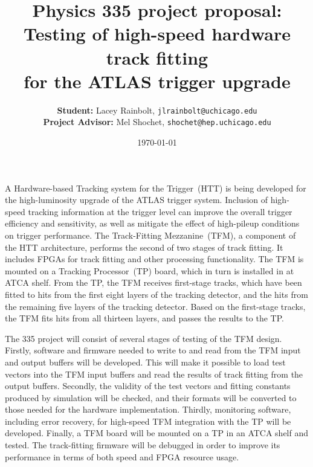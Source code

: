 \documentclass[12pt]{article}
\title{\Large %
	Physics 335 project proposal: \\
	Testing of high-speed hardware track fitting \\ for the ATLAS trigger upgrade}
\author{\textbf{Student:} Lacey Rainbolt, \texttt{jlrainbolt@uchicago.edu} \\ \textbf{Project Advisor:} Mel Shochet, \texttt{shochet@hep.uchicago.edu}}
\date{\today}
\begin{document}
\maketitle


A Hardware-based Tracking system for the Trigger~(HTT) is being developed for the high-luminosity upgrade of the ATLAS trigger system.  Inclusion of high-speed tracking information at the trigger level can improve the overall trigger efficiency and sensitivity, as well as mitigate the effect of high-pileup conditions on trigger performance.  The Track-Fitting Mezzanine~(TFM), a component of the HTT architecture, performs the second of two stages of track fitting.  It includes FPGAs for track fitting and other processing functionality.  The TFM is mounted on a Tracking Processor~(TP) board, which in turn is installed in at ATCA shelf.  From the TP, the TFM receives first-stage tracks, which have been fitted to hits from the first eight layers of the tracking detector, and the hits from the remaining five layers of the tracking detector.  Based on the first-stage tracks, the TFM fits hits from all thirteen layers, and passes the results to the TP.

The 335 project will consist of several stages of testing of the TFM design.  Firstly, software and firmware needed to write to and read from the TFM input and output buffers will be developed.  This will make it possible to load test vectors into the TFM input buffers and read the results of track fitting from the output buffers.  Secondly, the validity of the test vectors and fitting constants produced by simulation will be checked, and their formats will be converted to those needed for the hardware implementation.  Thirdly, monitoring software, including error recovery, for high-speed TFM integration with the TP will be developed.  Finally, a TFM board will be mounted on a TP in an ATCA shelf and tested.  The track-fitting firmware will be debugged in order to improve its performance in terms of both speed and FPGA resource usage.

\end{document}
